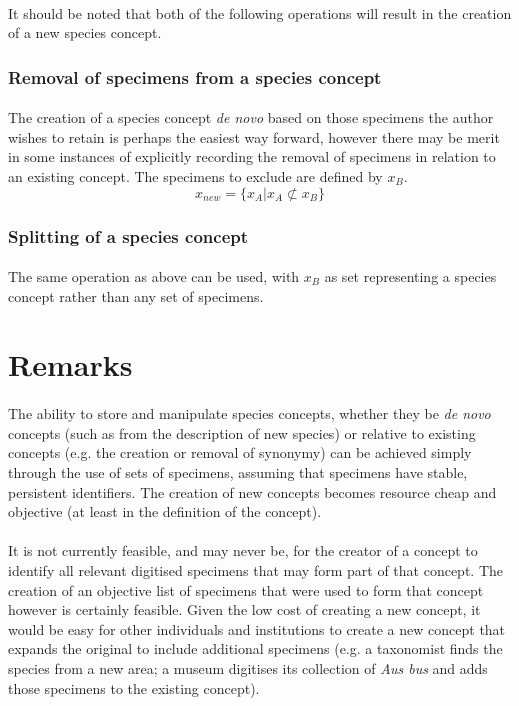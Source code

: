 \documentclass{article}
\begin{document}
   \paragraph{}
   It should be noted that both of the following operations will result in the creation of a new species concept.
   \subsubsection{Removal of specimens from a species concept}
   \paragraph{}
   The creation of a species concept \textit{de novo} based on those specimens the author wishes to retain is perhaps the easiest way forward, however there may be merit in some instances of explicitly recording the removal of specimens in relation to an existing concept. The specimens to exclude are defined by $x_B$.
   \[x_{new} = \{x_A|x_A \not\subset x_B\}\] 
   \subsubsection{Splitting of a species concept}
   \paragraph{}
   The same operation as above can be used, with $x_B$ as set representing a species concept rather than any set of specimens.
   
   \section{Remarks}
   \paragraph{}
   The ability to store and manipulate species concepts, whether they be \textit{de novo} concepts (such as from the description of new species) or relative to existing concepts (e.g. the creation or removal of synonymy) can be achieved simply through the use of sets of specimens, assuming that specimens have stable, persistent identifiers. The creation of new concepts becomes resource cheap and objective (at least in the definition of the concept).
   
   \paragraph{}
   It is not currently feasible, and may never be, for the creator of a concept to identify all relevant digitised specimens that may form part of that concept. The creation of an objective list of specimens that were used to form that concept however is certainly feasible. Given the low cost of creating a new concept, it would be easy for other individuals and institutions to create a new concept that expands the original to include additional specimens (e.g. a taxonomist finds the species from a new area; a museum digitises its collection of \textit{Aus bus} and adds those specimens to the existing concept).
   
\end{document}
